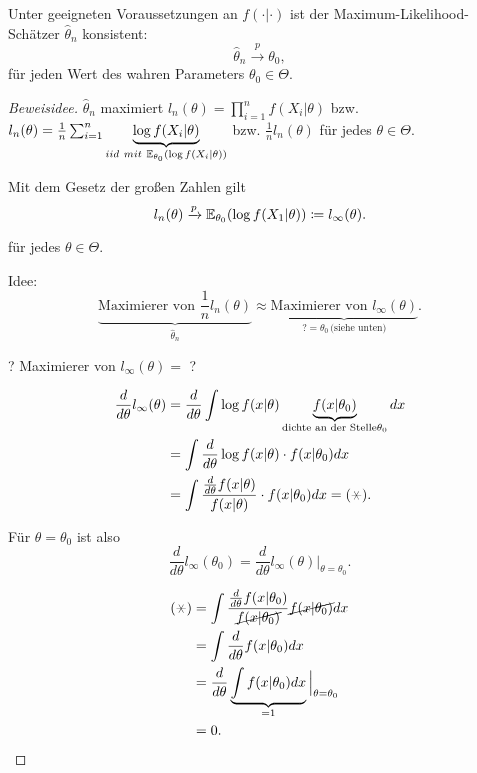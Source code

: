 \documentclass{tstextbook}
\begin{document}
	\begin{satz}[Konsistenz]
		Unter geeigneten Voraussetzungen an $ f(\cdot|\cdot) $ ist der Maximum-Likelihood-Schätzer $ \hat{\theta}_n $ konsistent:
		\[
		\hat{\theta}_n \xrightarrow{p} \theta_0,
		\]
		für jeden Wert des wahren Parameters $ \theta_0\in\Theta $.
	\end{satz}
	
	\begin{proof}[Beweisidee]
		$ \hat{\theta}_n $ maximiert $ l_n(\theta)=\prod_{i=1}^{n} f(X_i|\theta) $ bzw. $ l_n(\theta)= \frac{1}{n} \sum_{i=1}^{n} \underbrace{ \log f(X_i|\theta) }_{iid \ mit \ \mathbb E_{\theta_0} (\log f(X_i | \theta ))} $ bzw. $\frac{1}{n}l_n(\theta) $ für jedes $ \theta\in\Theta $. 
		
		Mit dem Gesetz der großen Zahlen gilt
		\[
		l_n(\theta)  \xrightarrow{p} \mathbb E_{\theta_0}(\log f(X_1|\theta)) \coloneqq l_\infty(\theta).
		\]
		
		für jedes $ \theta\in\Theta.$
		
		
		Idee: 
		\[
		\underbrace{\text{Maximierer von }\frac{1}{n}l_n(\theta)}_{\hat{\theta}_n} \approx \underbrace{\text{Maximierer von }l_\infty(\theta)}_{?=\theta_0 \, \text{(siehe unten)}}.
		\]
		
		? Maximierer von $ l_\infty ( \theta ) = $ ?
		
		\[
		\begin{aligned}
			\frac{d}{d\theta}l_\infty(\theta) & = \frac{d}{d\theta}\int\log f(x|\theta) \underbrace{ f(x|\theta_0)}_{\text{dichte an der Stelle} \theta_0 } dx \\
			& = \int \frac{d}{d\theta}\log f(x|\theta)\cdot f(x|\theta_0) dx \\
			& = \int \frac{\frac{d}{d\theta}f(x|\theta)}{f(x|\theta)}\cdot f(x|\theta_0) dx = (\hexstar).
		\end{aligned}
		\]
		
		Für $ \theta = \theta_0 $ ist also 
		\[ 
		\frac{d}{d\theta}l_\infty(\theta_0) = \frac{d}{d\theta}l_\infty(\theta)\Big|_{\theta=\theta_0} .
		\]
		
		\[
		\begin{aligned}
			(\hexstar) & = \int \frac{\frac{d}{d\theta}f(x|\theta_0)}{\cancel{f(x|\theta_0)}} \cancel{f(x|\theta_0)} dx \\
			& = \int \frac{d}{d\theta} f(x|\theta_0) dx \\
			& = \frac{d}{d\theta} \underbrace{\int f(x|\theta_0) dx}_{=1} \Big|_{\theta=\theta_0} \\
			& = 0.
		\end{aligned}
		\]
		

\end{proof}
\end{document}
